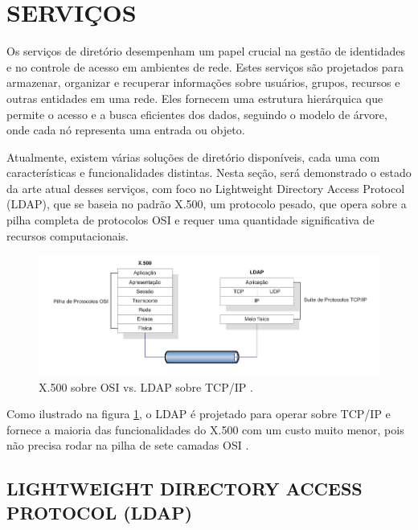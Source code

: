 \newpage

\section{SERVIÇOS}
\label{sec:referencial-teórico}
Os serviços de diretório desempenham um papel crucial na gestão de identidades e no controle de acesso em ambientes de rede. Estes serviços são projetados para armazenar, organizar e recuperar informações sobre usuários, grupos, recursos e outras entidades em uma rede. Eles fornecem uma estrutura hierárquica que permite o acesso e a busca eficientes dos dados, seguindo o modelo de árvore, onde cada nó representa uma entrada ou objeto.

Atualmente, existem várias soluções de diretório disponíveis, cada uma com características e funcionalidades distintas. Nesta seção, será demonstrado o estado da arte atual desses serviços, com foco no Lightweight Directory Access Protocol (LDAP), que se baseia no padrão X.500, um protocolo pesado, que opera sobre a pilha completa de protocolos OSI e requer uma quantidade significativa de recursos computacionais.

\begin{figure}[h]
    \centering
	\includegraphics[scale=0.6]{projeto/textuais/CamadasX.500LDAP.png}
	\caption[X.500 sobre OSI vs. LDAP sobre TCP/IP-]{X.500 sobre OSI vs. LDAP sobre TCP/IP \cite{machado2020}.
	\label{fig:camadaX.500Ldap}}
\end{figure}

Como ilustrado na figura \ref{fig:camadaX.500Ldap}, o LDAP é projetado para operar sobre TCP/IP e fornece a maioria das funcionalidades do X.500 com um custo muito menor, pois não precisa rodar na pilha de sete camadas OSI \cite{machado2020}.

\subsection{LIGHTWEIGHT DIRECTORY ACCESS PROTOCOL (LDAP)}


